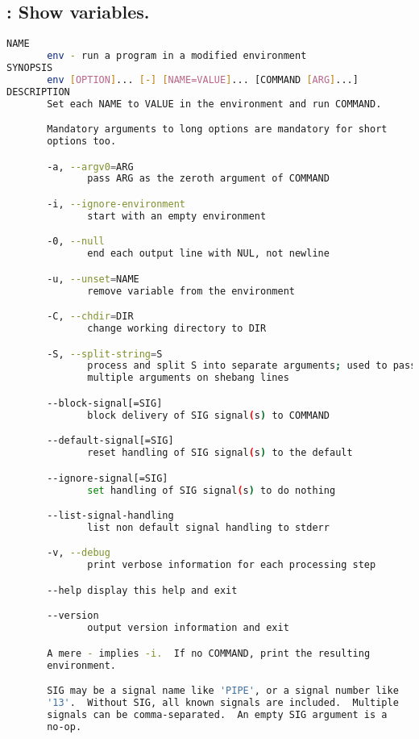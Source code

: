 % 
\subsection{: Show  variables.}

{\tiny{
\begin{lstlisting}[language=bash]
NAME
       env - run a program in a modified environment
SYNOPSIS
       env [OPTION]... [-] [NAME=VALUE]... [COMMAND [ARG]...]
DESCRIPTION
       Set each NAME to VALUE in the environment and run COMMAND.

       Mandatory arguments to long options are mandatory for short
       options too.

       -a, --argv0=ARG
              pass ARG as the zeroth argument of COMMAND

       -i, --ignore-environment
              start with an empty environment

       -0, --null
              end each output line with NUL, not newline

       -u, --unset=NAME
              remove variable from the environment

       -C, --chdir=DIR
              change working directory to DIR

       -S, --split-string=S
              process and split S into separate arguments; used to pass
              multiple arguments on shebang lines

       --block-signal[=SIG]
              block delivery of SIG signal(s) to COMMAND

       --default-signal[=SIG]
              reset handling of SIG signal(s) to the default

       --ignore-signal[=SIG]
              set handling of SIG signal(s) to do nothing

       --list-signal-handling
              list non default signal handling to stderr

       -v, --debug
              print verbose information for each processing step

       --help display this help and exit

       --version
              output version information and exit

       A mere - implies -i.  If no COMMAND, print the resulting
       environment.

       SIG may be a signal name like 'PIPE', or a signal number like
       '13'.  Without SIG, all known signals are included.  Multiple
       signals can be comma-separated.  An empty SIG argument is a
       no-op.


\end{lstlisting}}}
